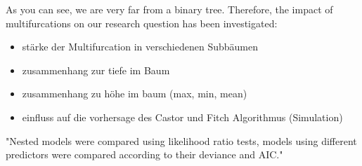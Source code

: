       As you can see, we are very far from a binary tree. Therefore, the impact of multifurcations on 
        our research question has been investigated:
      \begin{itemize}
        \item stärke der Multifurcation in verschiedenen Subbäumen
        \item zusammenhang zur tiefe im Baum
        \item zusammenhang zu höhe im baum (max, min, mean)
        \item einfluss auf die vorhersage des Castor und Fitch Algorithmus (Simulation) 
      \end{itemize}

      "Nested models were compared using likelihood ratio tests, models using different predictors were 
      compared according to their deviance and AIC."


